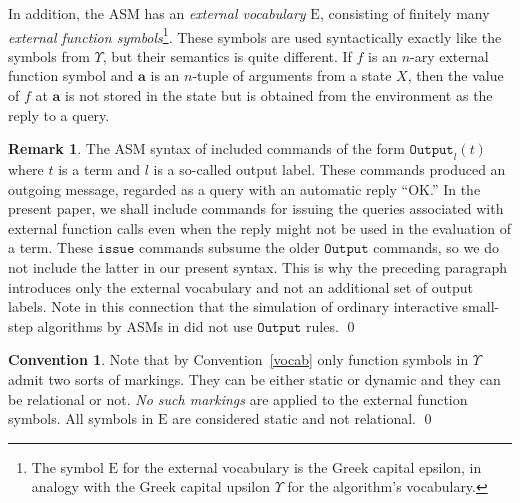 \documentclass{LMCS}
\theoremstyle{definition}
\newtheorem{rmk}[thm]{Remark}
\newtheorem{conn}[thm]{Convention}
\newcommand{\E}{\mathrm{E}}
\newcommand{\U}{\Upsilon}
\newcommand{\bld}[1]{\ensuremath{\mathbf {#1}}}
\newcommand{\ttt}[1]{\ensuremath{\mathtt {#1}}}
\begin{document}
In addition, the ASM
has an
\emph{external vocabulary} $\E$, consisting of finitely many
\emph{external function symbols}\footnote{The symbol $\E$ for the
external vocabulary is the Greek capital epsilon, in analogy with the
Greek capital upsilon $\U$ for the algorithm's vocabulary.}.
These symbols are used syntactically exactly like the symbols from
$\U$, but their semantics is quite different.  If $f$ is an
$n$-ary external function symbol and $\bld a$ is an $n$-tuple of
arguments from a state $X$, then the value of $f$ at $\bld a$ is not
stored in the state but is obtained from the environment as the reply
to a query.

\begin{rmk}
The ASM syntax of \cite{oa2} included commands of the form
$\ttt{Output}_l(t)$
where $t$ is a term and $l$ is a so-called output
label.  These commands produced an outgoing message, regarded as a
query with an automatic reply ``OK.''  In the present paper, we shall
include commands for issuing the queries associated with external
function calls even when the reply might not be used in the evaluation
of a  term.  These \ttt{issue} commands subsume the older \ttt{Output}
commands, so we do not include the latter in our present syntax.  This
is why the preceding paragraph introduces only the external vocabulary
and not an additional set of output labels.  Note in this connection
that the simulation of ordinary interactive small-step algorithms by
ASMs in \cite{oa3} did not use \ttt{Output} rules.
\qed\end{rmk}

\begin{conn}
  Note that by Convention~\ref{vocab} only function symbols in
  $\U$ admit two sorts of markings.   They can be either static
  or dynamic and they can be relational or not.  \emph{No such
  markings} are applied to the external function symbols.  All symbols
  in $\E$ are considered static and not relational.
\qed\end{conn}
\end{document}
